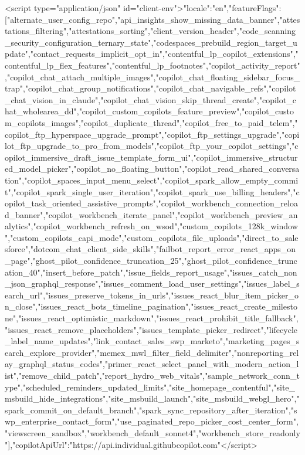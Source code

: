   <script type="application/json" id="client-env">{"locale":"en","featureFlags":["alternate_user_config_repo","api_insights_show_missing_data_banner","attestations_filtering","attestations_sorting","client_version_header","code_scanning_security_configuration_ternary_state","codespaces_prebuild_region_target_update","contact_requests_implicit_opt_in","contentful_lp_copilot_extensions","contentful_lp_flex_features","contentful_lp_footnotes","copilot_activity_report","copilot_chat_attach_multiple_images","copilot_chat_floating_sidebar_focus_trap","copilot_chat_group_notifications","copilot_chat_navigable_refs","copilot_chat_vision_in_claude","copilot_chat_vision_skip_thread_create","copilot_chat_wholearea_dd","copilot_custom_copilots_feature_preview","copilot_custom_copilots_images","copilot_duplicate_thread","copilot_free_to_paid_telem","copilot_ftp_hyperspace_upgrade_prompt","copilot_ftp_settings_upgrade","copilot_ftp_upgrade_to_pro_from_models","copilot_ftp_your_copilot_settings","copilot_immersive_draft_issue_template_form_ui","copilot_immersive_structured_model_picker","copilot_no_floating_button","copilot_read_shared_conversation","copilot_spaces_input_menu_select","copilot_spark_allow_empty_commit","copilot_spark_single_user_iteration","copilot_spark_use_billing_headers","copilot_task_oriented_assistive_prompts","copilot_workbench_connection_reload_banner","copilot_workbench_iterate_panel","copilot_workbench_preview_analytics","copilot_workbench_refresh_on_wsod","custom_copilots_128k_window","custom_copilots_capi_mode","custom_copilots_file_uploads","direct_to_salesforce","dotcom_chat_client_side_skills","failbot_report_error_react_apps_on_page","ghost_pilot_confidence_truncation_25","ghost_pilot_confidence_truncation_40","insert_before_patch","issue_fields_report_usage","issues_catch_non_json_graphql_response","issues_comment_load_user_settings","issues_label_search_url","issues_preserve_tokens_in_urls","issues_react_blur_item_picker_on_close","issues_react_bots_timeline_pagination","issues_react_create_milestone","issues_react_optimistic_markdown","issues_react_prohibit_title_fallback","issues_react_remove_placeholders","issues_template_picker_redirect","lifecycle_label_name_updates","link_contact_sales_swp_marketo","marketing_pages_search_explore_provider","memex_mwl_filter_field_delimiter","nonreporting_relay_graphql_status_codes","primer_react_select_panel_with_modern_action_list","remove_child_patch","report_hydro_web_vitals","sample_network_conn_type","scheduled_reminders_updated_limits","site_homepage_contentful","site_msbuild_hide_integrations","site_msbuild_launch","site_msbuild_webgl_hero","spark_commit_on_default_branch","spark_sync_repository_after_iteration","swp_enterprise_contact_form","use_paginated_repo_picker_cost_center_form","viewscreen_sandbox","workbench_default_sonnet4","workbench_store_readonly"],"copilotApiUrl":"https://api.individual.githubcopilot.com"}</script>
